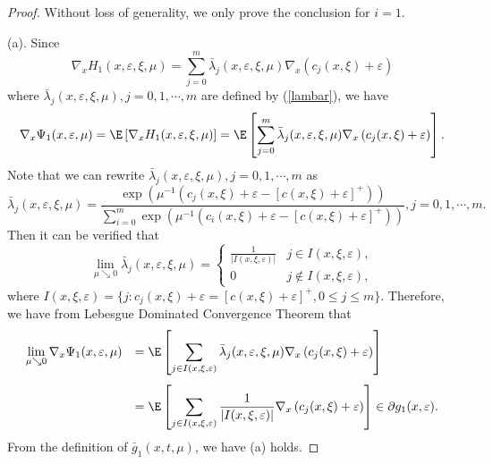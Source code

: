 \begin{proof}
Without loss of generality, we only prove the
conclusion for $i=1$. %

(a). Since
\[\nabla_xH_1(x,\varepsilon,\xi,\mu)=\displaystyle\sum_{j=0}^m
\bar\lambda_j(x,\varepsilon,\xi,\mu)\nabla_x\left(c_{j}(x,\xi)+
\varepsilon\right)\] where $\bar\lambda_j(x,\varepsilon,\xi,\mu),
j=0,1,\cdots,m$ are defined by (\ref{lambar}), we have
\begin{equation*}\label{eq:nabla-g1}
\nabla_x\Psi_1(x,\varepsilon,\mu)=\E\left[\nabla_xH_1(x,
\varepsilon,\xi,\mu)\right]=\E\left[\displaystyle\sum_{j=0}^m
\bar\lambda_j(x,\varepsilon,\xi,\mu)\nabla_x
\left(c_{j}(x,\xi)+\varepsilon\right)\right].
\end{equation*}
Note that we can rewrite $\bar\lambda_j(x,\varepsilon,\xi,\mu),
j=0,1,\cdots,m$ as
\[\bar\lambda_j(x,\varepsilon,\xi,\mu)=\displaystyle\frac{\exp\left(\mu^{-1}
\left(c_j(x,\xi)+\varepsilon-[c(x,\xi)+\varepsilon]^+\right)\right)}
{\displaystyle\sum_{i=0}^m\exp\left(\mu^{-1}\left(c_i(x,\xi)+\varepsilon
-[c(x,\xi)+\varepsilon]^+\right)\right)}, j=0,1,\cdots,m.\] Then it
can be verified that
\[\displaystyle\lim_{\mu\searrow 0}\bar\lambda_j(x,\varepsilon,\xi,\mu)=\left\{
\begin{array}{ll}
\displaystyle\frac{1}{|I(x,\xi,\varepsilon)|} & j\in I(x,\xi,\varepsilon),\\[16pt]
0 & j \notin I(x,\xi,\varepsilon),
\end{array}
\right.\] where
$I(x,\xi,\varepsilon)=\{j:c_j(x,\xi)+\varepsilon=[c(x,\xi)+\varepsilon]^+,
0\leq j\leq m\}$. Therefore, we have from Lebesgue Dominated
Convergence Theorem that
\[\begin{array}{ll}
\displaystyle \lim_{\mu\searrow 0}\nabla_x\Psi_1(x,\varepsilon,\mu)
&=\E\left[\displaystyle\sum_{j\in
I(x,\xi,\varepsilon)}\bar\lambda_j(x,\varepsilon,\xi,\mu)
\nabla_x\left(c_j(x,\xi)+\varepsilon\right)\right]\\[20pt]
&=\E\left[\displaystyle\sum_{j\in I(x,\xi,\varepsilon)}
\displaystyle\frac{1}{|I(x,\xi,\varepsilon)|}\nabla_x\left(c_j(x,\xi)+
\varepsilon\right)\right]\in \partial g_1(x,\varepsilon).
\end{array}\]
From the definition of $\bar g_1(x,t,\mu)$, we have (a) holds.


\end{proof}
